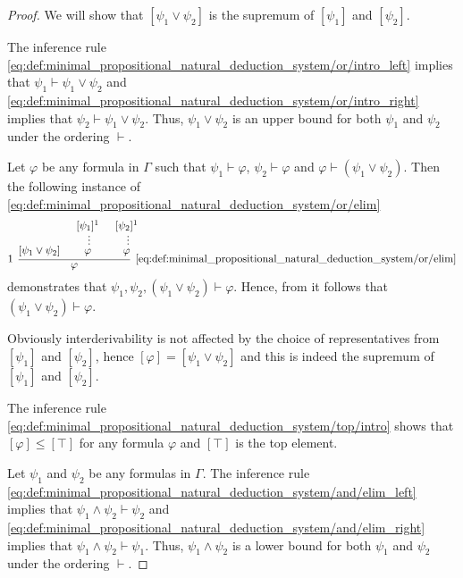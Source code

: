 \begin{proof}
   We will show that \( [\psi_1 \vee \psi_2] \) is the supremum of \( [\psi_1] \) and \( [\psi_2] \).

  The inference rule \eqref{eq:def:minimal_propositional_natural_deduction_system/or/intro_left} implies that \( \psi_1 \vdash \psi_1 \vee \psi_2 \) and \eqref{eq:def:minimal_propositional_natural_deduction_system/or/intro_right} implies that \( \psi_2 \vdash \psi_1 \vee \psi_2 \). Thus, \( \psi_1 \vee \psi_2 \) is an upper bound for both \( \psi_1 \) and \( \psi_2 \) under the ordering \( \vdash \).

  Let \( \varphi \) be any formula in \( \Gamma \) such that \( \psi_1 \vdash \varphi \), \( \psi_2 \vdash \varphi \) and \( \varphi \vdash (\psi_1 \vee \psi_2) \). Then the following instance of \eqref{eq:def:minimal_propositional_natural_deduction_system/or/elim}
  \begin{equation*}
    \begin{prooftree}
      \hypo{ [\psi_1 \vee \psi_2] }
      \hypo{ [\psi_1]^1 }
      \ellipsis {} { \varphi }
      \hypo{ [\psi_2]^1 }
      \ellipsis {} { \varphi }
      \infer[left label=\( 1 \)]3[\ref{eq:def:minimal_propositional_natural_deduction_system/or/elim}]{ \varphi }
    \end{prooftree}
  \end{equation*}
  demonstrates that \( \psi_1, \psi_2, (\psi_1 \vee \psi_2) \vdash \varphi \). Hence, from  it follows that \( (\psi_1 \vee \psi_2) \vdash \varphi \).

  Obviously interderivability is not affected by the choice of representatives from \( [\psi_1] \) and \( [\psi_2] \), hence \( [\varphi] = [\psi_1 \vee \psi_2] \) and this is indeed the supremum of \( [\psi_1] \) and \( [\psi_2] \).

   The inference rule \eqref{eq:def:minimal_propositional_natural_deduction_system/top/intro} shows that \( [\varphi] \leq [\top] \) for any formula \( \varphi \) and \( [\top] \) is the top element.

   Let \( \psi_1 \) and \( \psi_2 \) be any formulas in \( \Gamma \). The inference rule \eqref{eq:def:minimal_propositional_natural_deduction_system/and/elim_left} implies that \( \psi_1 \wedge \psi_2 \vdash \psi_2 \) and \eqref{eq:def:minimal_propositional_natural_deduction_system/and/elim_right} implies that \( \psi_1 \wedge \psi_2 \vdash \psi_1 \). Thus, \( \psi_1 \wedge \psi_2 \) is a lower bound for both \( \psi_1 \) and \( \psi_2 \) under the ordering \( \vdash \).


\end{proof}
